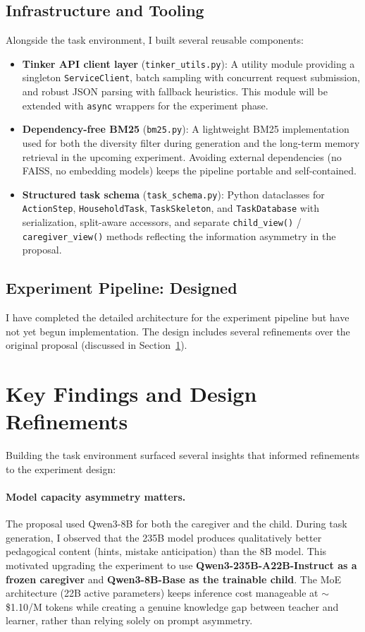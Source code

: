 \documentclass[11pt]{article}
\begin{document}
\subsection{Infrastructure and Tooling}

Alongside the task environment, I built several reusable components:

\begin{itemize}
    \item \textbf{Tinker API client layer} (\texttt{tinker\_utils.py}): A utility module providing a singleton \texttt{ServiceClient}, batch sampling with concurrent request submission, and robust JSON parsing with fallback heuristics. This module will be extended with \texttt{async} wrappers for the experiment phase.
    \item \textbf{Dependency-free BM25} (\texttt{bm25.py}): A lightweight BM25 implementation used for both the diversity filter during generation and the long-term memory retrieval in the upcoming experiment. Avoiding external dependencies (no FAISS, no embedding models) keeps the pipeline portable and self-contained.
    \item \textbf{Structured task schema} (\texttt{task\_schema.py}): Python dataclasses for \texttt{ActionStep}, \texttt{HouseholdTask}, \texttt{TaskSkeleton}, and \texttt{TaskDatabase} with serialization, split-aware accessors, and separate \texttt{child\_view()} / \texttt{caregiver\_view()} methods reflecting the information asymmetry in the proposal.
\end{itemize}

\subsection{Experiment Pipeline: Designed}

I have completed the detailed architecture for the experiment pipeline but have not yet begun implementation. The design includes several refinements over the original proposal (discussed in Section~\ref{sec:findings}).

\section{Key Findings and Design Refinements}
\label{sec:findings}

Building the task environment surfaced several insights that informed refinements to the experiment design:

\paragraph{Model capacity asymmetry matters.} The proposal used Qwen3-8B for both the caregiver and the child. During task generation, I observed that the 235B model produces qualitatively better pedagogical content (hints, mistake anticipation) than the 8B model. This motivated upgrading the experiment to use \textbf{Qwen3-235B-A22B-Instruct as a frozen caregiver} and \textbf{Qwen3-8B-Base as the trainable child}. The MoE architecture (22B active parameters) keeps inference cost manageable at $\sim$\$1.10/M tokens while creating a genuine knowledge gap between teacher and learner, rather than relying solely on prompt asymmetry.
\end{document}
